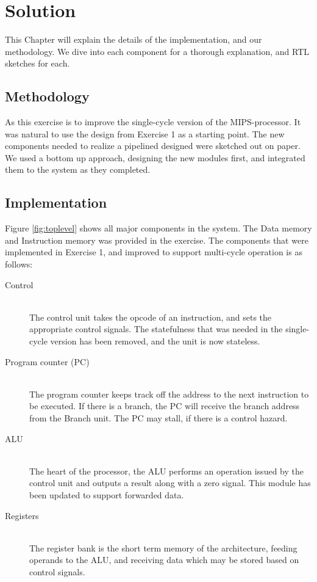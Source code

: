 \chapter{Solution}
This Chapter will explain the details of the implementation, and our methodology. We dive into each component for a thorough explanation, and RTL sketches for each.


\section{Methodology}
As this exercise is to improve the single-cycle version of the MIPS-processor. It was natural to use the design from Exercise 1 \cite{ex1report} as a starting point.
The new components needed to realize a pipelined designed were sketched out on paper. We used a bottom up approach, designing the new modules first, and integrated them to the system as they completed.

\section{Implementation}
Figure \ref{fig:toplevel} shows all major components in the system. 
The Data memory and Instruction memory was provided in the exercise.
The components that were implemented in Exercise 1, and improved to support multi-cycle operation is as follows:

\begin{description}
  \item[Control] \hfill \\
  The control unit takes the opcode of an instruction, and sets the appropriate control signals. The statefulness that was needed in the single-cycle version has been removed, and the unit is now stateless.  
  \item[Program counter (PC)] \hfill \\
  The program counter keeps track off the address to the next instruction to be executed. If there is a branch, the PC will receive the branch address from the Branch unit. The PC may stall, if there is a control hazard.
  \item[ALU] \hfill \\
  The heart of the processor, the ALU performs an operation issued by the control unit and outputs a result along with a zero signal. This module has been updated to support forwarded data.
  \item[Registers] \hfill \\
  The register bank is the short term memory of the architecture, feeding operands to the ALU, and receiving data which may be stored based on control signals.
\end{description}

